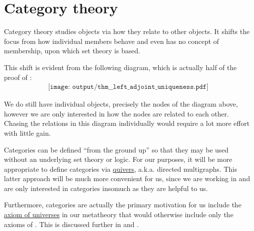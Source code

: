 \section{Category theory}\label{sec:category_theory}

Category theory studies objects via how they relate to other objects. It shifts the focus from how individual members behave and even has no concept of membership, upon which set theory is based.

This shift is evident from the following diagram, which is actually half of the proof of :
\begin{equation*}
  \begin{aligned}
    \texttt{[image: output/thm\_\_left\_adjoint\_uniqueness.pdf]}
  \end{aligned}
\end{equation*}

We do still have individual objects, precisely the nodes of the diagram above, however we are only interested in how the nodes are related to each other. Chasing the relations in this diagram individually would require a lot more effort with little gain.

Categories can be defined \enquote{from the ground up} so that they may be used without an underlying set theory or logic. For our purposes, it will be more appropriate to define categories via \hyperref[def:quiver]{quivers}, a.k.a. directed multigraphs. This latter approach will be much more convenient for us, since we are working in \hyperref[def:axiom_of_universes]{} and are only interested in categories insomuch as they are helpful to us.

Furthermore, categories are actually the primary motivation for us include the \hyperref[def:axiom_of_universes]{axiom of universes} in our metatheory that would otherwise include only the axioms of \hyperref[def:zfc]{}. This is discussed further in  and .
